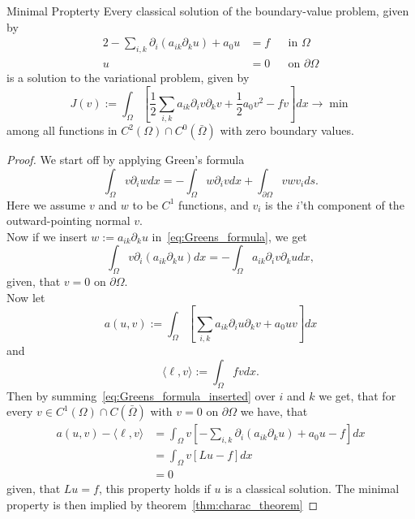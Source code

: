 \begin{thmx}{Minimal Propterty}
    Every classical solution of the boundary-value problem, given by
    \begin{alignat}{2}
        -\sum_{i,k} \partial_i (a_{ik}\partial_k u) + a_0 u &= f && \text{in } \Omega \\
        u &= 0 && \text{on } \partial \Omega
    \end{alignat}
    is a solution to the variational problem, given by
    \[
        J(v):=\int_\Omega [\frac{1}{2}\sum_{i,k} a_{ik} \partial_i v\partial_k v + \frac{1}{2} a_0 v^2 -fv]dx \longrightarrow \min
    \]
    among all functions in $C^2(\Omega)\cap C^0(\bar{\Omega})$ with zero boundary values. 
\end{thmx}

\begin{proof}
    We start off by applying Green's formula
    \[
    \label{eq:Greens_formula}
        \int_\Omega v\partial_i w dx = -\int_\Omega w\partial_i v dx + \int_{\partial \Omega} v w v_i ds.
    \]
    Here we assume $v$ and $w$ to be $C^1$ functions, and $v_i$ is the $i$'th component of the outward-pointing normal $v$.
    \\
    Now if we insert $w:=a_{ik}\partial_k u$ in~\eqref{eq:Greens_formula}, we get
    \[
    \label{eq:Greens_formula_inserted}
        \int_\Omega v\partial_i (a_{ik} \partial_k u) dx = -\int_\Omega a_{ik} \partial_i v\partial_k u dx,
    \]  
    given, that $v=0$ on $\partial \Omega$.
    \\
    Now let 
    \begin{equation}
    \label{eq:a(u,v)}
        a(u,v) := \int_\Omega \left[\sum_{i,k} a_{ik} \partial_i u \partial_k v +a_0 uv \right]dx
    \end{equation}
    and
    \begin{equation}
    \label{eq:l(v)}
        \langle \ell,v \rangle := \int_\Omega fv dx.
    \end{equation}
    Then by summing~\eqref{eq:Greens_formula_inserted} over $i$ and $k$ we get, that for every $v\in C^1(\Omega) \cap C(\bar{\Omega})$ with $v=0$ on $\partial \Omega$ we have, that 
    \begin{align*}
        a(u,v) - \langle \ell,v \rangle &= \int_\Omega v\left[ -\sum_{i,k} \partial_i (a_{ik} \partial_k u) + a_0 u - f \right] dx \\     
        &= \int_\Omega v [Lu - f] dx \\
        &= 0
    \end{align*}
    given, that $Lu = f$, this property holds if $u$ is a classical solution. The minimal property is then implied by theorem~\ref{thm:charac_theorem}
\end{proof}
